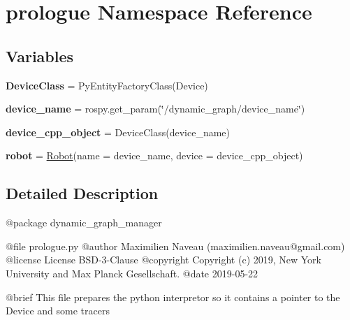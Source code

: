 \hypertarget{namespaceprologue}{}\section{prologue Namespace Reference}
\label{namespaceprologue}
\subsection*{Variables}
\begin{DoxyCompactItemize}
\item 
{\bfseries Device\+Class} = Py\+Entity\+Factory\+Class(\textquotesingle{}Device\textquotesingle{})\hypertarget{namespaceprologue_abd2547699ff6cb2be741ae50e1610fee}{}\label{namespaceprologue_abd2547699ff6cb2be741ae50e1610fee}

\item 
{\bfseries device\+\_\+name} = rospy.\+get\+\_\+param(\char`\"{}/dynamic\+\_\+graph/device\+\_\+name\char`\"{})\hypertarget{namespaceprologue_a6d57c567c699c8a138a54cf2f3f0a5b9}{}\label{namespaceprologue_a6d57c567c699c8a138a54cf2f3f0a5b9}

\item 
{\bfseries device\+\_\+cpp\+\_\+object} = Device\+Class(device\+\_\+name)\hypertarget{namespaceprologue_afb52f4b421c82dff3297ad7a17295f09}{}\label{namespaceprologue_afb52f4b421c82dff3297ad7a17295f09}

\item 
{\bfseries robot} = \hyperlink{classrobot_1_1Robot}{Robot}(name = device\+\_\+name, device = device\+\_\+cpp\+\_\+object)\hypertarget{namespaceprologue_aa584c81ddec9449e6199c0ca195e9aea}{}\label{namespaceprologue_aa584c81ddec9449e6199c0ca195e9aea}

\end{DoxyCompactItemize}


\subsection{Detailed Description}
\begin{DoxyVerb}@package dynamic_graph_manager

@file prologue.py
@author Maximilien Naveau (maximilien.naveau@gmail.com)
@license License BSD-3-Clause
@copyright Copyright (c) 2019, New York University and Max Planck Gesellschaft.
@date 2019-05-22

@brief This file prepares the python interpretor so it contains a pointer to the
Device and some tracers\end{DoxyVerb}
 